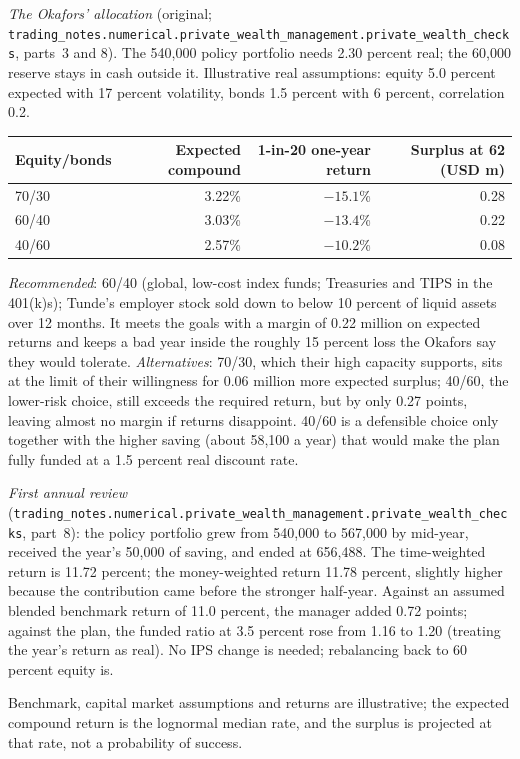 \begin{qfmethod}
 \emph{The Okafors' allocation} (original; \nolinkurl{trading_notes.numerical.private_wealth_management.private_wealth_checks}, parts~3 and 8). The 540,000 policy portfolio needs 2.30 percent real; the 60,000 reserve stays in cash outside it. Illustrative real assumptions: equity 5.0 percent expected with 17 percent volatility, bonds 1.5 percent with 6 percent, correlation 0.2.
\begin{center}\small
\begin{tabular}{@{}lrrr@{}}
\toprule
Equity/bonds & Expected compound & 1-in-20 one-year return & Surplus at 62 (USD m) \\
\midrule
70/30 & 3.22\% & $-15.1$\% & 0.28 \\
60/40 & 3.03\% & $-13.4$\% & 0.22 \\
40/60 & 2.57\% & $-10.2$\% & 0.08 \\
\bottomrule
\end{tabular}
\end{center}
\emph{Recommended}: 60/40 (global, low-cost index funds; Treasuries and TIPS in the 401(k)s); Tunde's employer stock sold down to below 10 percent of liquid assets over 12 months. It meets the goals with a margin of 0.22 million on expected returns and keeps a bad year inside the roughly 15 percent loss the Okafors say they would tolerate. \emph{Alternatives}: 70/30, which their high capacity supports, sits at the limit of their willingness for 0.06 million more expected surplus; 40/60, the lower-risk choice, still exceeds the required return, but by only 0.27 points, leaving almost no margin if returns disappoint. 40/60 is a defensible choice only together with the higher saving (about 58,100 a year) that would make the plan fully funded at a 1.5 percent real discount rate.

\emph{First annual review} (\nolinkurl{trading_notes.numerical.private_wealth_management.private_wealth_checks}, part~8): the policy portfolio grew from 540,000 to 567,000 by mid-year, received the year's 50,000 of saving, and ended at 656,488. The time-weighted return is 11.72 percent; the money-weighted return 11.78 percent, slightly higher because the contribution came before the stronger half-year. Against an assumed blended benchmark return of 11.0 percent, the manager added 0.72 points; against the plan, the funded ratio at 3.5 percent rose from 1.16 to 1.20 (treating the year's return as real). No IPS change is needed; rebalancing back to 60 percent equity is.

 Benchmark, capital market assumptions and returns are illustrative; the expected compound return is the lognormal median rate, and the surplus is projected at that rate, not a probability of success.


\end{qfmethod}
